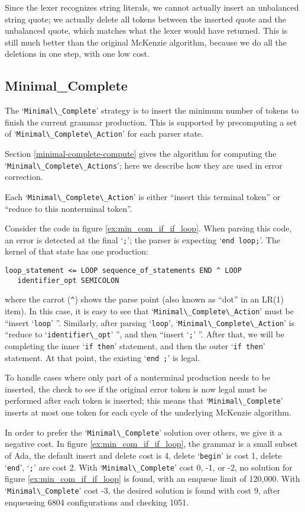 \documentclass{article}
\newcommand{\code}[1]{`\lstinline|#1|'}
\begin{document}
Since the lexer recognizes string literals, we cannot actually insert
an unbalanced string quote; we actually delete all tokens between the
inserted quote and the unbalanced quote, which matches what the lexer
would have returned. This is still much better than the original
McKenzie algorithm, because we do all the deletions in one step, with
one low cost.

\subsection{Minimal\_Complete}
The \code{Minimal\_Complete} strategy is to insert the minimum number
of tokens to finish the current grammar production. This is supported
by precomputing a set of \code{Minimal\_Complete\_Action} for each
parser state.

Section \ref{minimal-complete-compute} gives the algorithm for
computing the \code{Minimal\_Complete\_Actions}; here we describe how
they are used in error correction.

Each \code{Minimal\_Complete\_Action} is either ``insert this terminal
token'' or ``reduce to this nonterminal token''.

Consider the code in figure \ref{ex:min_com_if_if_loop}. When
parsing this code, an error is detected at the final \code{;}; the
parser is expecting \code{end loop;}. The kernel of that state has one
production:
\begin{verbatim}
loop_statement <= LOOP sequence_of_statements END ^ LOOP
   identifier_opt SEMICOLON
\end{verbatim}
where the carrot (\verb|^|) shows the parse point (also known as
``dot'' in an LR(1) item). In this case, it is easy to see that
\code{Minimal\_Complete\_Action} must be ``insert \code{loop} ''.
Similarly, after parsing \code{loop}, \code{Minimal\_Complete\_Action}
is ``reduce to \code{identifier\_opt} '', and then ``insert \code{;}
''. After that, we will be completing the inner \code{if then}
statement, and then the outer \code{if then} statement. At that point,
the existing \code{end ;} is legal.

To handle cases where only part of a nonterminal production needs to
be inserted, the check to see if the original error token is now legal
must be performed after each token is inserted; this means that
\code{Minimal\_Complete} inserts at most one token for each cycle of
the underlying McKenzie algorithm.

In order to prefer the \code{Minimal\_Complete} solution over others,
we give it a negative cost. In figure \ref{ex:min_com_if_if_loop}, the
grammar is a small subset of Ada, the
default insert and delete cost is 4, delete \code{begin} is cost 1,
delete \code{end}, \code{;} are cost 2. With \code{Minimal\_Complete}
cost 0, -1, or -2, no solution for figure \ref{ex:min_com_if_if_loop}
is found, with an enqueue limit of 120,000. With
\code{Minimal\_Complete} cost -3, the desired solution is found with
cost 9, after enqueueing 6804 configurations and checking 1051.
\end{document}
